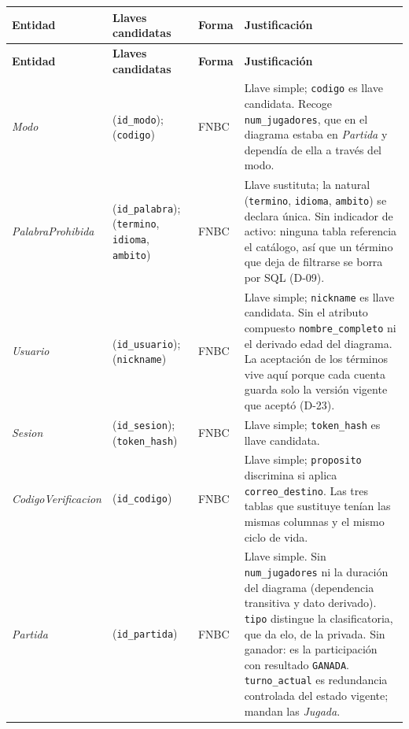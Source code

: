 \begin{center}\small
\begin{longtable}{|L{0.19\textwidth}|L{0.23\textwidth}|L{0.08\textwidth}|L{0.38\textwidth}|}
\hline
\textbf{Entidad} & \textbf{Llaves candidatas} & \textbf{Forma} & \textbf{Justificación} \\ \hline
\endfirsthead
\hline
\textbf{Entidad} & \textbf{Llaves candidatas} & \textbf{Forma} & \textbf{Justificación} \\ \hline
\endhead
\textit{Modo} & (\texttt{id\_\allowbreak{}modo}); (\texttt{codigo}) & FNBC & Llave simple; \texttt{codigo} es llave candidata. Recoge \texttt{num\_\allowbreak{}jugadores}, que en el diagrama estaba en \textit{Partida} y dependía de ella a través del modo. \\ \hline
\textit{Palabra\-Prohibida} & (\texttt{id\_\allowbreak{}palabra}); (\texttt{termino}, \texttt{idioma}, \texttt{ambito}) & FNBC & Llave sustituta; la natural (\texttt{termino}, \texttt{idioma}, \texttt{ambito}) se declara única. Sin indicador de activo: ninguna tabla referencia el catálogo, así que un término que deja de filtrarse se borra por SQL (\mbox{D-09}). \\ \hline
\textit{Usuario} & (\texttt{id\_\allowbreak{}usuario}); (\texttt{nickname}) & FNBC & Llave simple; \texttt{nickname} es llave candidata. Sin el atributo compuesto \texttt{nombre\_\allowbreak{}completo} ni el derivado edad del diagrama. La aceptación de los términos vive aquí porque cada cuenta guarda solo la versión vigente que aceptó (\mbox{D-23}). \\ \hline
\textit{Sesion} & (\texttt{id\_\allowbreak{}sesion}); (\texttt{token\_\allowbreak{}hash}) & FNBC & Llave simple; \texttt{token\_\allowbreak{}hash} es llave candidata. \\ \hline
\textit{Codigo\-Verificacion} & (\texttt{id\_\allowbreak{}codigo}) & FNBC & Llave simple; \texttt{proposito} discrimina si aplica \texttt{correo\_\allowbreak{}destino}. Las tres tablas que sustituye tenían las mismas columnas y el mismo ciclo de vida. \\ \hline
\textit{Partida} & (\texttt{id\_\allowbreak{}partida}) & FNBC & Llave simple. Sin \texttt{num\_\allowbreak{}jugadores} ni la duración del diagrama (dependencia transitiva y dato derivado). \texttt{tipo} distingue la clasificatoria, que da elo, de la privada. Sin ganador: es la participación con resultado \texttt{GANADA}. \texttt{turno\_\allowbreak{}actual} es redundancia controlada del estado vigente; mandan las \textit{Jugada}. \\ \hline

\end{longtable}
\end{center}
